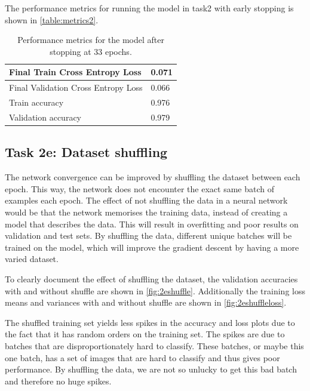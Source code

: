 \documentclass{article}
\begin{document}
The performance metrics for running the model in task2 with early stopping is shown in \autoref{table:metrics2}.
\begin{table}[H]
\centering
\begin{tabular}{|l|l|}
\hline

Final Train Cross Entropy Loss & 0.071           \\ \hline
Final Validation Cross Entropy Loss & 0.066           \\ \hline
Train accuracy           & 0.976         \\ \hline
Validation accuracy           & 0.979          \\ \hline
\end{tabular}
\caption{Performance metrics for the model after stopping at 33 epochs.}
\label{table:metrics2}
\end{table}


\subsection{Task 2e: Dataset shuffling}
The network convergence can be improved by shuffling the dataset between each epoch. This way, the network does not encounter the  exact same batch of examples each epoch. The effect of not shuffling the data in a neural network would be that the network memorises the training data, instead of creating a model that describes the data. This will result in overfitting and poor results on validation and test sets. By shuffling the data, different unique batches will be trained on the model, which will improve the gradient descent by having a more varied dataset. 

To clearly document the effect of shuffling the dataset, the validation accuracies with and without shuffle are shown in \autoref{fig:2eshuffle}. Additionally the training loss means and variances with and without shuffle are shown in \autoref{fig:2eshuffleloss}.

The shuffled training set yields less spikes in the accuracy and loss plots due to the fact that it has random orders on the training set. The spikes are due to batches that are disproportionately hard to classify. These batches, or maybe this one batch, has a set of images that are hard to classify and thus gives poor performance. By shuffling the data, we are not so unlucky to get this bad batch and therefore no huge spikes. 
\end{document}
